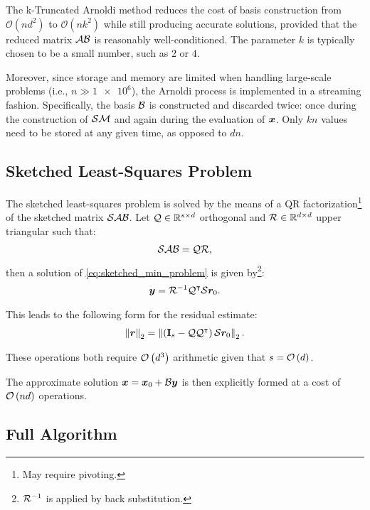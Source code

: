 The k-Truncated Arnoldi method reduces the cost of basis construction from $\mathcal{O}(n d^2)$ to $\mathcal{O}(n k^2)$ while still producing accurate solutions, provided that the reduced matrix $\mathcal{A} \mathcal{B}$ is reasonably well-conditioned. The parameter $k$ is typically chosen to be a small number, such as $2$ or $4$.

Moreover, since storage and memory are limited when handling large-scale problems (i.e., $n \gg \num{1e6}$), the Arnoldi process is implemented in a streaming fashion. Specifically, the basis $\mathcal{B}$ is constructed and discarded twice: once during the construction of $\mathcal{S} \mathcal{M}$ and again during the evaluation of $\bm{x}$. Only $k n$ values need to be stored at any given time, as opposed to $d n$.

\newpage
\subsection{Sketched Least-Squares Problem} \label{sseq:least_squares}

The sketched least-squares problem is solved by the means of a QR factorization\footnote{May require pivoting.} of the sketched matrix $\mathcal{S} \mathcal{A} \mathcal{B}$. Let $\mathcal{Q} \in \mathbb{R}^{s \times d}$ orthogonal and $\mathcal{R} \in \mathbb{R}^{d \times d}$ upper triangular such that:
\begin{align}
    \mathcal{S} \mathcal{A} \mathcal{B} = \mathcal{Q} \mathcal{R},
\end{align}
then a solution of \cref{eq:sketched_min_problem} is given by\footnote{$\mathcal{R}^{-1}$ is applied by back substitution.}:
\begin{align}
    \bm{y} = \mathcal{R}^{-1} \mathcal{Q}^{\intercal} \mathcal{S} \bm{r}_0.
\end{align}

This leads to the following form for the residual estimate:
\begin{align}
    \left\lVert \bm{r} \right\rVert_2 = \left\lVert  \left( \mathbf{I}_s - \mathcal{Q} \mathcal{Q}^{\intercal} \right) \mathcal{S} \bm{r}_0  \right\rVert_2.
\end{align}

These operations both require $\mathcal{O} \left( d^3 \right)$ arithmetic given that $s = \mathcal{O} \left( d \right)$.

The approximate solution $\bm{x} = \bm{x}_0 + \mathcal{B} \bm{y}$ is then explicitly formed at a cost of $\mathcal{O} \left( n d \right)$ operations.

\subsection{Full Algorithm} \label{sseq:algorithm}

